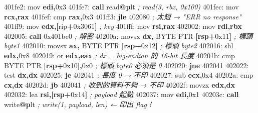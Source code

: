 \documentclass[10pt,a4paper]{article}
\newenvironment{Shaded}{\begin{snugshade}}{\end{snugshade}}
\newcommand{\BaseNTok}[1]{\textcolor[rgb]{0.00,0.00,0.81}{#1}}
\newcommand{\BuiltInTok}[1]{#1}
\newcommand{\CommentTok}[1]{\textcolor[rgb]{0.56,0.35,0.01}{\textit{#1}}}
\newcommand{\ControlFlowTok}[1]{\textcolor[rgb]{0.13,0.29,0.53}{\textbf{#1}}}
\newcommand{\DataTypeTok}[1]{\textcolor[rgb]{0.13,0.29,0.53}{#1}}
\newcommand{\DecValTok}[1]{\textcolor[rgb]{0.00,0.00,0.81}{#1}}
\newcommand{\ErrorTok}[1]{\textcolor[rgb]{0.64,0.00,0.00}{\textbf{#1}}}
\newcommand{\FunctionTok}[1]{\textcolor[rgb]{0.13,0.29,0.53}{\textbf{#1}}}
\newcommand{\KeywordTok}[1]{\textcolor[rgb]{0.13,0.29,0.53}{\textbf{#1}}}
\newcommand{\NormalTok}[1]{#1}
\newcommand{\OperatorTok}[1]{\textcolor[rgb]{0.81,0.36,0.00}{\textbf{#1}}}
\renewenvironment{Shaded}{%
  \def\FrameCommand{\fboxsep=3.2pt\colorbox{shadecolor}}%
  \MakeFramed{\advance\hsize-\width\FrameRestore\small}%
}{%
  \endMakeFramed
}
\begin{document}
\begin{Shaded}
\begin{Highlighting}[]
\NormalTok{401fe2:  }\BuiltInTok{mov}  \KeywordTok{edi}\OperatorTok{,}\BaseNTok{0x3}
\NormalTok{401fe7:  }\ControlFlowTok{call}\NormalTok{ read}\FunctionTok{@}\ErrorTok{p}\NormalTok{lt                      }\CommentTok{; read(3, rbx, 0x100)}
\NormalTok{401fec:  }\BuiltInTok{mov}  \KeywordTok{rcx}\OperatorTok{,}\KeywordTok{rax}
\NormalTok{401fef:  }\BuiltInTok{cmp}  \KeywordTok{rax}\OperatorTok{,}\BaseNTok{0x3}
\NormalTok{401ff3:  }\ControlFlowTok{jle}  \DecValTok{402080}                        \CommentTok{; 太短 → "ERR no response"}
\NormalTok{401ff9:  }\BuiltInTok{mov}  \KeywordTok{edx}\OperatorTok{,[}\NormalTok{rip}\OperatorTok{+}\BaseNTok{0x3061}\OperatorTok{]}              \CommentTok{; key}
\NormalTok{401fff:  }\BuiltInTok{mov}  \KeywordTok{rsi}\OperatorTok{,}\KeywordTok{rax}
\NormalTok{402002:  }\BuiltInTok{mov}  \KeywordTok{rdi}\OperatorTok{,}\KeywordTok{rbx}
\NormalTok{402005:  }\ControlFlowTok{call} \BaseNTok{0x401be0}                      \CommentTok{; 解密}
\NormalTok{40200a:  }\BuiltInTok{movsx} \KeywordTok{dx}\OperatorTok{,} \DataTypeTok{BYTE} \DataTypeTok{PTR} \OperatorTok{[}\KeywordTok{rsp}\OperatorTok{+}\BaseNTok{0x11}\OperatorTok{]}      \CommentTok{; 標頭 byte1}
\NormalTok{402010:  }\BuiltInTok{movsx} \KeywordTok{ax}\OperatorTok{,} \DataTypeTok{BYTE} \DataTypeTok{PTR} \OperatorTok{[}\KeywordTok{rsp}\OperatorTok{+}\BaseNTok{0x12}\OperatorTok{]}      \CommentTok{; 標頭 byte2}
\NormalTok{402016:  }\BuiltInTok{shl}   \KeywordTok{edx}\OperatorTok{,}\BaseNTok{0x8}
\NormalTok{402019:  }\BuiltInTok{or}    \KeywordTok{edx}\OperatorTok{,}\KeywordTok{eax}                      \CommentTok{; dx = big{-}endian 的 16{-}bit 長度}
\NormalTok{40201b:  }\BuiltInTok{cmp}  \DataTypeTok{BYTE} \DataTypeTok{PTR} \OperatorTok{[}\KeywordTok{rsp}\OperatorTok{+}\BaseNTok{0x10}\OperatorTok{],}\BaseNTok{0x0}       \CommentTok{; 標頭 byte0 必須是 0}
\NormalTok{402020:  }\ControlFlowTok{jne}  \DecValTok{402041}
\NormalTok{402022:  }\BuiltInTok{test} \KeywordTok{dx}\OperatorTok{,}\KeywordTok{dx}
\NormalTok{402025:  }\ControlFlowTok{je}   \DecValTok{402041}                        \CommentTok{; 長度 0 → 不印}
\NormalTok{402027:  }\BuiltInTok{sub}  \KeywordTok{ecx}\OperatorTok{,}\BaseNTok{0x4}
\NormalTok{40202a:  }\BuiltInTok{cmp}  \KeywordTok{cx}\OperatorTok{,}\KeywordTok{dx}
\NormalTok{40202d:  }\ControlFlowTok{jb}   \DecValTok{402041}                        \CommentTok{; 收到的資料不夠 → 不印}
\NormalTok{40202f:  }\BuiltInTok{movzx} \KeywordTok{edx}\OperatorTok{,}\KeywordTok{dx}
\NormalTok{402032:  }\BuiltInTok{lea}  \KeywordTok{rsi}\OperatorTok{,[}\KeywordTok{rsp}\OperatorTok{+}\BaseNTok{0x14}\OperatorTok{]}                \CommentTok{; payload 起點}
\NormalTok{402037:  }\BuiltInTok{mov}  \KeywordTok{edi}\OperatorTok{,}\BaseNTok{0x1}
\NormalTok{40203c:  }\ControlFlowTok{call}\NormalTok{ write}\FunctionTok{@}\ErrorTok{p}\NormalTok{lt                     }\CommentTok{; write(1, payload, len)  ← 印出 flag！}
\end{Highlighting}
\end{Shaded}
\end{document}
